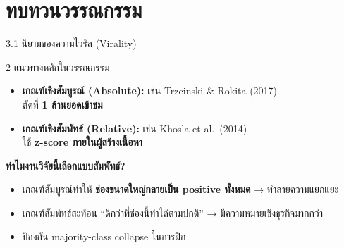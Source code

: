 \documentclass[aspectratio=169,11pt,xcolor=dvipsnames]{beamer}
\newcommand{\hl}[1]{\textcolor{kmitlOrange}{\textbf{#1}}}
\begin{document}
\section{ทบทวนวรรณกรรม}

\begin{frame}{3.1 นิยามของความไวรัล (Virality)}
  \begin{block}{2 แนวทางหลักในวรรณกรรม}
    \begin{itemize}
      \item \textbf{เกณฑ์เชิงสัมบูรณ์ (Absolute):} เช่น Trzcinski \& Rokita (2017)\\
        ตัดที่ \hl{1 ล้านยอดเข้าชม}
      \item \textbf{เกณฑ์เชิงสัมพัทธ์ (Relative):} เช่น Khosla et al.\ (2014)\\
        ใช้ \hl{z-score ภายในผู้สร้างเนื้อหา}
    \end{itemize}
  \end{block}
  \textbf{ทำไมงานวิจัยนี้เลือกแบบสัมพัทธ์?}
  \begin{itemize}
    \item เกณฑ์สัมบูรณ์ทำให้ \hl{ช่องขนาดใหญ่กลายเป็น positive ทั้งหมด} → ทำลายความแยกแยะ
    \item เกณฑ์สัมพัทธ์สะท้อน ``ดีกว่าที่ช่องนี้ทำได้ตามปกติ'' → มีความหมายเชิงธุรกิจมากกว่า
    \item ป้องกัน majority-class collapse ในการฝึก
  \end{itemize}
\end{frame}
\end{document}
